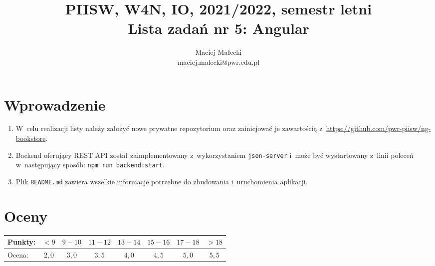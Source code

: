 \documentclass[12pt]{article}
\title{PIISW, W4N, IO, 2021/2022, semestr letni\\Lista zadań nr 5: Angular}
\author{Maciej Małecki\\ \small maciej.malecki@pwr.edu.pl}
\begin{document}
    \maketitle

    \section*{Wprowadzenie}
        \begin{enumerate}
            \item W~celu realizacji listy należy założyć nowe prywatne repozytorium oraz zainicjować je zawartością z~\href{https://github.com/pwr-piisw/ng-bookstore}{https://github.com/pwr-piisw/ng-bookstore}.
            \item Backend oferujący REST API został zaimplementowany z~wykorzystaniem \texttt{json-server} i~może być wystartowany z~linii poleceń w~następujący sposób: \texttt{npm run backend:start}.
			\item Plik \texttt{README.md} zawiera wszelkie informacje potrzebne do zbudowania i~uruchomienia aplikacji.
        \end{enumerate}

    \section*{Oceny}
    \begin{tabular}{|l|c|c|c|c|c|c|c|}
        \hline
        Punkty: & $<9$ & $9-10$ & $11-12$ & $13-14$ & $15-16$ & $17-18$ & $>18$\\
        \hline
        Ocena:  & $2,0$ & $3,0$ & $3,5$ & $4,0$ & $4,5$ & $5,0$ & $5,5$\\
        \hline
    \end{tabular}
\end{document}
